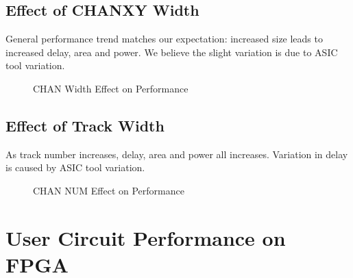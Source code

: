 \clearpage

\subsection{Effect of CHANXY Width}
\label{subsec:asic_eff_chanxy_w}

General performance trend matches our expectation: increased size leads to increased delay, area and power.
We believe the slight variation is due to ASIC tool variation. \par

\begin{figure}[htp]
	\begin{center}
		\renewcommand{\captionfont}{\small}
		\caption{CHAN Width Effect on Performance}
		\label{fig:perf-chanw}
	\end{center}
\end{figure}

\clearpage

\subsection{Effect of Track Width}
\label{subsec:asic_eff_track_w}

As track number increases, delay, area and power all increases. Variation in delay is caused by ASIC tool variation.

\begin{figure}[htp]
	\begin{center}
		\renewcommand{\captionfont}{\small}
		\caption{CHAN NUM Effect on Performance}
		\label{fig:perf-chann}
	\end{center}
\end{figure}

\section{User Circuit Performance on FPGA}
\label{sec:vpr_perf}


